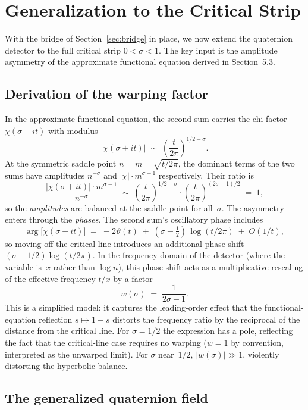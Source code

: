 \documentclass[12pt,a4paper]{article}
\begin{document}
\section{Generalization to the Critical Strip}
\label{sec:rh-generalization}

With the bridge of Section~\ref{sec:bridge} in place, we now extend the quaternion detector to the full critical strip $0 < \sigma < 1$. The key input is the amplitude asymmetry of the approximate functional equation derived in Section~5.3.

\subsection{Derivation of the warping factor}

In the approximate functional equation, the second sum carries the chi factor $\chi(\sigma+it)$ with modulus
\[
|\chi(\sigma+it)| \;\sim\; \left(\frac{t}{2\pi}\right)^{1/2-\sigma}.
\]
At the symmetric saddle point $n = m = \sqrt{t/2\pi}$, the dominant terms of the two sums have amplitudes $n^{-\sigma}$ and $|\chi|\cdot m^{\sigma-1}$ respectively. Their ratio is
\[
\frac{|\chi(\sigma+it)|\cdot m^{\sigma-1}}{n^{-\sigma}} \;\sim\; \left(\frac{t}{2\pi}\right)^{1/2-\sigma} \cdot \left(\frac{t}{2\pi}\right)^{(2\sigma-1)/2} \;=\; 1,
\]
so the \emph{amplitudes} are balanced at the saddle point for all~$\sigma$. The asymmetry enters through the \emph{phases}. The second sum's oscillatory phase includes
\[
\arg\bigl[\chi(\sigma+it)\bigr] \;=\; -2\vartheta(t) \;+\; (\sigma - \tfrac12)\,\log(t/2\pi) \;+\; O(1/t),
\]
so moving off the critical line introduces an additional phase shift $(\sigma - 1/2)\log(t/2\pi)$. In the frequency domain of the detector (where the variable is~$x$ rather than $\log n$), this phase shift acts as a multiplicative rescaling of the effective frequency $t/x$ by a factor
\[
w(\sigma) \;=\; \frac{1}{2\sigma - 1}.
\]
This is a simplified model: it captures the leading-order effect that the functional-equation reflection $s \mapsto 1-s$ distorts the frequency ratio by the reciprocal of the distance from the critical line. For $\sigma = 1/2$ the expression has a pole, reflecting the fact that the critical-line case requires no warping ($w = 1$ by convention, interpreted as the unwarped limit). For $\sigma$ near~$1/2$, $|w(\sigma)| \gg 1$, violently distorting the hyperbolic balance.

\subsection{The generalized quaternion field}
\end{document}
